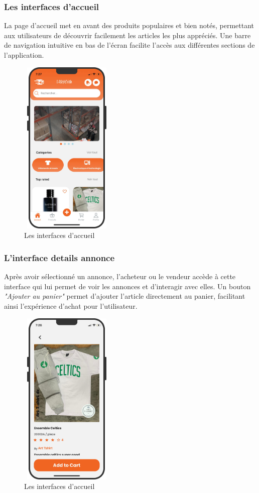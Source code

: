 \documentclass[edit,12pt,a4paper,ChapStyle,oneside,doubleinterligne]{report}
\begin{document}
\subsubsection{Les interfaces d’accueil}
La page d'accueil met en avant des produits populaires et bien notés, permettant aux utilisateurs de découvrir facilement les articles les plus appréciés. Une barre de navigation intuitive en bas de l'écran facilite l'accès aux différentes sections de l'application.
  \begin{figure} [H]
    \centering
    \includegraphics[width=4.5cm , height = 8.5cm , angle=360]{images/app home.png}
    \caption{Les interfaces d'accueil}
    \label{fig:colors}
\end{figure}

\subsubsection{L'interface details annonce}
Après avoir sélectionné un annonce, l'acheteur ou le vendeur accède à cette interface qui lui permet de voir les annonces et d'interagir avec elles. Un bouton \textit{"Ajouter au panier"} permet d'ajouter l'article directement au panier, facilitant ainsi l'expérience d'achat pour l'utilisateur.
  \begin{figure} [H]
    \centering
    \includegraphics[width=4.5cm , height = 8.5cm , angle=360]{images/app annonce.png}
    \caption{Les interfaces d'accueil}
    \label{fig:colors}
\end{figure}
\end{document}
